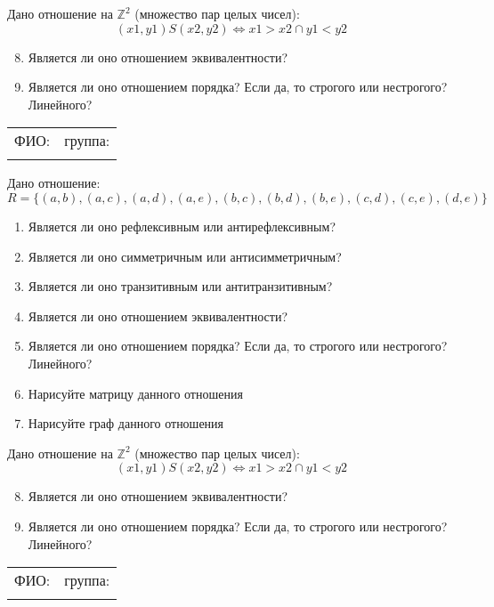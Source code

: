 \documentclass[russian,12pt]{article}
\begin{document}
Дано отношение на $\mathbb{Z}^2$ (множество пар целых чисел):
$$(x1, y1)S(x2, y2) \iff x1 > x2 \cap y1 < y2$$
\begin{enumerate}
\setcounter{enumi}{7}
\item Является ли оно отношением эквивалентности?
\item Является ли оно отношением порядка? Если да, то строгого или нестрогого? Линейного?
\end{enumerate}
\newpage
\thispagestyle{empty}
\begin{tabular}{|p{}|p{}|}
\hline
ФИО: & группа: \\
 & \\ \hline
\end{tabular}

\vspace{12pt}

Дано отношение:
$$R = \{(a, b), (a, c), (a, d), (a, e), (b, c), (b, d), (b, e), (c, d), (c, e), (d, e)\}$$
\begin{enumerate}
\item Является ли оно рефлексивным или антирефлексивным?
\item Является ли оно симметричным или антисимметричным?
\item Является ли оно транзитивным или антитранзитивным?
\item Является ли оно отношением эквивалентности?
\item Является ли оно отношением порядка? Если да, то строгого или нестрогого? Линейного?
\item Нарисуйте матрицу данного отношения
\item Нарисуйте граф данного отношения
\end{enumerate}

Дано отношение на $\mathbb{Z}^2$ (множество пар целых чисел):
$$(x1, y1)S(x2, y2) \iff x1 > x2 \cap y1 < y2$$
\begin{enumerate}
\setcounter{enumi}{7}
\item Является ли оно отношением эквивалентности?
\item Является ли оно отношением порядка? Если да, то строгого или нестрогого? Линейного?
\end{enumerate}
\newpage
\thispagestyle{empty}
\begin{tabular}{|p{}|p{}|}
\hline
ФИО: & группа: \\
 & \\ \hline
\end{tabular}
\end{document}
